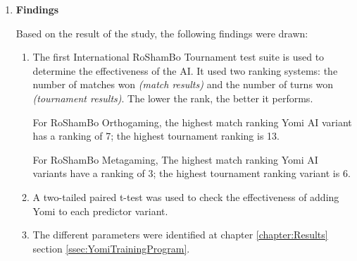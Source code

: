 \begin{enumerate}[leftmargin=0em, itemindent=1.8em]
{\begin{enumerate}[label*=\arabic*., leftmargin=0em,  listparindent=3em]
The objectives of the study are as follows:

\begin{enumerate}[label=\arabic*.]

\item How can the Yomi concept be modeled in decision making for Artificial Intelligence?

\item Can the Yomi Estimator help improve the performance of some specific RoShamBo predictors?

\item What parameters can be considered for the Yomi framework?

\item How can these parameters be automatically fine-tuned?

\end{enumerate}

\hspace{1em}

\item \begin{center}\textbf{Findings}\end{center}

\ifnotUCFormat
\else
	\hspace{1em}
\fi

Based on the result of the study, the following findings were drawn:

\begin{enumerate}[label=\arabic*.]
\item The first International RoShamBo Tournament test suite is used to determine the effectiveness of the AI. It used two ranking systems: the number of matches won \textit{(match results)} and the number of turns won \textit{(tournament results)}. The lower the rank, the better it performs.

For RoShamBo Orthogaming, the highest match ranking Yomi AI variant has a ranking of 7; the highest tournament ranking is 13.

For RoShamBo Metagaming, The highest match ranking Yomi AI variants have a ranking of 3; the highest tournament ranking variant is 6.

\item A two-tailed paired t-test was used to check the effectiveness of adding Yomi to each predictor variant. 

\item The different parameters were identified at chapter \ref{chapter:Results} section \ref{ssec:YomiTrainingProgram}.


\end{enumerate}
\end{enumerate}}
\end{enumerate}
